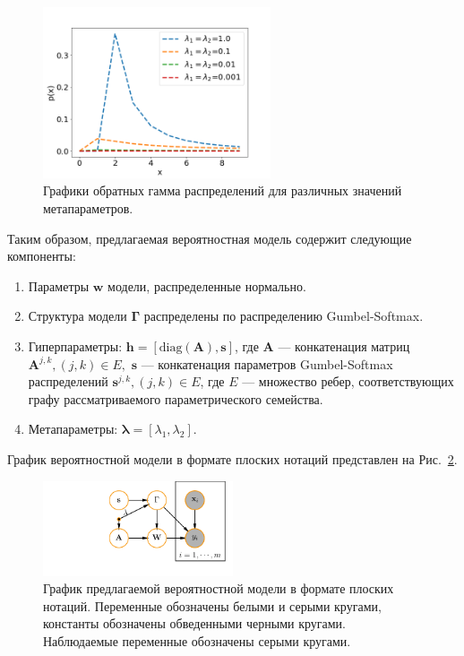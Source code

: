 \begin{figure}
\centering
\includegraphics[width=0.6\textwidth]{plots/notebooks/invgamma.png}
\caption{Графики обратных гамма распределений для различных значений метапараметров.}
\label{fig:inv-gamma}
\end{figure}


Таким образом, предлагаемая вероятностная модель содержит следующие компоненты:
\begin{enumerate}
\item Параметры $\mathbf{w}$ модели, распределенные нормально.
\item Структура модели $\boldsymbol{\Gamma}$ распределены по распределению Gumbel-Softmax.
\item Гиперпараметры: $\mathbf{h} = [\text{diag}(\mathbf{A}), \mathbf{s}]$, где $\mathbf{A}$ --- конкатенация матриц $\mathbf{A}^{j,k}, (j,k) \in E,$ $\mathbf{s}$ --- конкатенация параметров Gumbel-Softmax распределений $\mathbf{s}^{j,k}, (j,k) \in E$, где $E$ --- множество ребер, соответствующих графу рассматриваемого параметрического семейства.
\item Метапараметры: $\boldsymbol{\lambda} = [\lambda_1, \lambda_2].$
\end{enumerate}

График вероятностной модели в формате плоских нотаций представлен на Рис.~\ref{fig:plate_prob}.
\begin{figure}
\centering
   \includegraphics[width=0.5\textwidth]{plots/notebooks/simple_plate.pdf}
\caption{График предлагаемой вероятностной модели в формате плоских нотаций. Переменные обозначены белыми и серыми кругами, константы обозначены обведенными черными кругами. Наблюдаемые переменные обозначены серыми кругами.}
\label{fig:plate_prob}
\end{figure}

